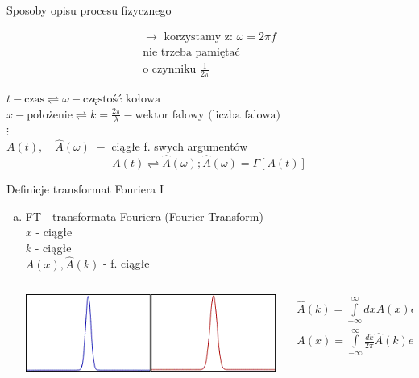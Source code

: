 \begin{frame}[allowframebreaks]{Sposoby opisu procesu fizycznego}
\begin{block}
\[\begin{array}{r}
		\rightarrow \,\, \text{korzystamy z: } \omega = 2 \pi f\\ \text{nie trzeba pamiętać}\\ \text{o czynniku } \frac{1}{2 \pi}
	\end{array}
	\]
	\end{block}
	$t - \text{czas} \rightleftharpoons \omega - \text{częstość kołowa}$
	\\ $x - \text{położenie} \rightleftharpoons k = \frac{2 \pi}{\lambda} - \text{wektor falowy (liczba falowa)}$
	\\ $\vdots$
	\\ $A(t), \quad \widehat{A}(\omega) \,\, - $ ciągłe f. swych argumentów
	\[
		A(t) \rightleftharpoons \widehat{A}(\omega); \widehat{A}(\omega) = \Gamma[A(t)]
	\]
\end{frame}
\begin{frame}{Definicje transformat Fouriera I}
	\begin{enumerate}[a)]
		\item FT - transformata Fouriera (Fourier Transform) \\
		$x$ - ciągłe \\
		$k$ - ciągłe \\
		$A(x), \widehat{A}(k)$ - f. ciągłe
        \begin{columns}
            \begin{column}{0.35\textwidth}
                \includegraphics[width=\textwidth]{img/16/ft_wykres1.png}
            \end{column}
            \begin{column}{0.65\textwidth}
                \begin{block}
                    \centering
                    \renewcommand{\arraystretch}{1.5}
                    \setlength{\abovedisplayskip}{0pt}
                    \setlength{\belowdisplayskip}{0pt}
                    \setlength{\abovedisplayshortskip}{0pt}
                    \setlength{\belowdisplayshortskip}{0pt}
                    \[
                        \begin{array}{c}
                            \widehat{A}(k) = \int\limits_{-\infty}^{\infty}dx A(x) e^{-ikx} \\
                            A(x) = \int\limits_{-\infty}^{\infty} \frac{dk}{2 \pi} \widehat{A}(k) e^{ikx}
                        \end{array}
                        \tag{16.1}
                    \]
                \end{block}
            \end{column}
        \end{columns}
	\end{enumerate}
\end{frame}

